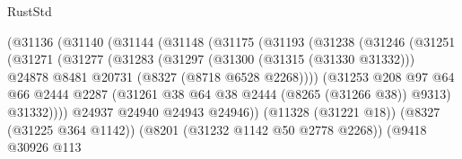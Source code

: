 \begin{lexlean}{RustStd}
\begin{coremodule}
                                (@31136
                                  (@31140
                                    (@31144
                                      (@31148
                                        (@31175
                                          (@31193
                                            (@31238
                                              (@31246
                                                (@31251
                                                  (@31271
                                                    (@31277
                                                      (@31283
                                                        (@31297
                                                          (@31300 (@31315 (@31330 @31332)))
                                                          @24878
                                                          @8481
                                                          @20731
                                                          (@8327 (@8718 @6528 @2268))))
                                                      (@31253
                                                        @208
                                                        @97
                                                        @64
                                                        @66
                                                        @2444
                                                        @2287
                                                        (@31261
                                                          @38
                                                          @64
                                                          @38
                                                          @2444
                                                          (@8265 (@31266 @38))
                                                          @9313)
                                                        @31332))))
                                                @24937
                                                @24940
                                                @24943
                                                @24946))
                                            (@11328 (@31221 @18))
                                            (@8327 (@31225 @364 @1142))
                                            (@8201 (@31232 @1142 @50 @2778 @2268))
                                            (@9418
                                              @30926
                                              @113

\end{coremodule}
\end{lexlean}
